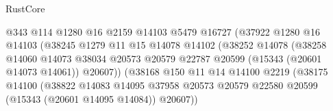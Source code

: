 \begin{lexlean}{RustCore}
\begin{coremodule}
                                          @343
                                          @114
                                          @1280
                                          @16
                                          @2159
                                          @14103
                                          @5479
                                          @16727
                                          (@37922
                                            @1280
                                            @16
                                            @14103
                                            (@38245
                                              @1279
                                              @11
                                              @15
                                              @14078
                                              @14102
                                              (@38252
                                                @14078
                                                (@38258
                                                  @14060
                                                  @14073
                                                  @38034
                                                  @20573
                                                  @20579
                                                  @22787
                                                  @20599
                                                  (@15343 (@20601 @14073 @14061))
                                                  @20607))
                                              (@38168
                                                @150
                                                @11
                                                @14
                                                @14100
                                                @2219
                                                (@38175
                                                  @14100
                                                  (@38822
                                                    @14083
                                                    @14095
                                                    @37958
                                                    @20573
                                                    @20579
                                                    @22580
                                                    @20599
                                                    (@15343 (@20601 @14095 @14084))
                                                    @20607))

\end{coremodule}
\end{lexlean}
